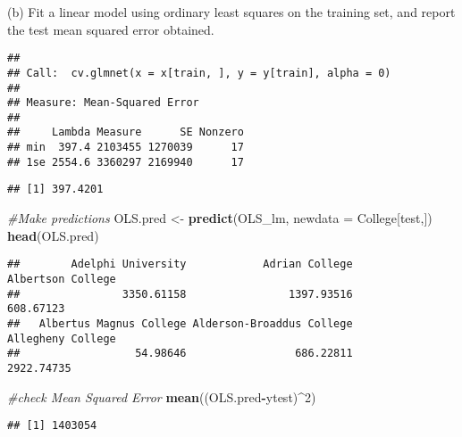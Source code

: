 \documentclass[
  ignorenonframetext,
]{beamer}
\newenvironment{Shaded}{\begin{snugshade}}{\end{snugshade}}
\newcommand{\CommentTok}[1]{\textcolor[rgb]{0.56,0.35,0.01}{\textit{#1}}}
\newcommand{\DataTypeTok}[1]{\textcolor[rgb]{0.13,0.29,0.53}{#1}}
\newcommand{\DecValTok}[1]{\textcolor[rgb]{0.00,0.00,0.81}{#1}}
\newcommand{\KeywordTok}[1]{\textcolor[rgb]{0.13,0.29,0.53}{\textbf{#1}}}
\newcommand{\NormalTok}[1]{#1}
\newcommand{\OperatorTok}[1]{\textcolor[rgb]{0.81,0.36,0.00}{\textbf{#1}}}
\newcommand{\StringTok}[1]{\textcolor[rgb]{0.31,0.60,0.02}{#1}}
\begin{document}
\begin{frame}[fragile]{(b) Fit a linear model using ordinary least
squares on the training set, and report the test mean squared error
obtained.}
\begin{verbatim}
## 
## Call:  cv.glmnet(x = x[train, ], y = y[train], alpha = 0) 
## 
## Measure: Mean-Squared Error 
## 
##     Lambda Measure      SE Nonzero
## min  397.4 2103455 1270039      17
## 1se 2554.6 3360297 2169940      17
\end{verbatim}

\begin{Shaded}
\end{Shaded}

\begin{verbatim}
## [1] 397.4201
\end{verbatim}

\begin{Shaded}
\begin{Highlighting}[]
\CommentTok{#Make predictions}
\NormalTok{OLS.pred <-}\StringTok{ }\KeywordTok{predict}\NormalTok{(OLS_lm, }\DataTypeTok{newdata =}\NormalTok{ College[test,])}
\KeywordTok{head}\NormalTok{(OLS.pred)}
\end{Highlighting}
\end{Shaded}

\begin{verbatim}
##        Adelphi University            Adrian College         Albertson College 
##                3350.61158                1397.93516                 608.67123 
##   Albertus Magnus College Alderson-Broaddus College         Allegheny College 
##                  54.98646                 686.22811                2922.74735
\end{verbatim}

\begin{Shaded}
\begin{Highlighting}[]
\CommentTok{#check Mean Squared Error}
\KeywordTok{mean}\NormalTok{((OLS.pred}\OperatorTok{-}\NormalTok{ytest)}\OperatorTok{^}\DecValTok{2}\NormalTok{)}
\end{Highlighting}
\end{Shaded}

\begin{verbatim}
## [1] 1403054
\end{verbatim}

\end{frame}
\end{document}
